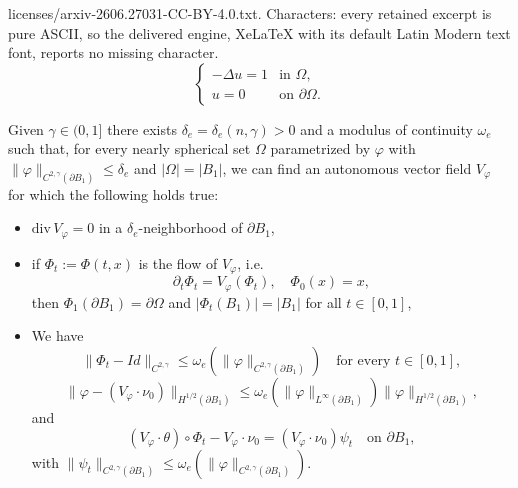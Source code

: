 \documentclass[10pt,a4paper]{amsart}
\newcommand{\abs}[1]{{\left|#1\right|}}
\begin{document}
licenses/arxiv-2606.27031-CC-BY-4.0.txt. Characters: every retained excerpt is pure ASCII, so the delivered engine, XeLaTeX with its default Latin Modern text font, reports no missing character.
\begin{equation}\label{Problema(u)}
    \begin{cases}
        -\Delta u=1 & \text{in } \Omega,\\
        u=0 & \text{on } \partial\Omega.
    \end{cases}
\end{equation}

\begin{lemma}\label{lemmaA.1}
    Given $\gamma\in(0,1]$ there exists $\delta_e=\delta_e(n,\gamma)>0$ and a modulus of continuity $\omega_e$ such that, for every nearly spherical set $\Omega$ parametrized by $\varphi$ with $\|\varphi\|_{C^{2,\gamma}(\partial B_1)}\leq\delta_e$ and $\abs{\Omega}=\abs{B_1}$, we can find an autonomous vector field $V_\varphi$ for which the following holds true:
    \begin{itemize}
        \item [(i)] $\mathrm{div}\,V_\varphi=0$ in a $\delta_e$-neighborhood of $\partial B_1$,
        \item [(ii)] if $\Phi_t:=\Phi(t,x)$ is the flow of $V_\varphi$, i.e.
        \begin{equation*}
            \partial_t \Phi_t=V_\varphi(\Phi_t),\quad \Phi_0(x)=x,
        \end{equation*}
        then $\Phi_1(\partial B_1)=\partial\Omega$ and $\abs{\Phi_t(B_1)}=\abs{B_1}$ for all $t\in[0,1]$,
        \item [(iii)] We have  
        \begin{equation*}
            \|\Phi_t-Id\|_{C^{2,\gamma}}\leq\omega_e(\|\varphi\|_{C^{2,\gamma}(\partial B_1)})\quad \text{for every }t\in[0,1],
        \end{equation*}
        \begin{equation*}
            \|\varphi-(V_\varphi\cdot\nu_0)\|_{H^{1/2}(\partial B_1)}\leq\omega_e(\|\varphi\|_{L^\infty(\partial B_1)})\|\varphi\|_{H^{1/2}(\partial B_1)},
        \end{equation*}
        and
        \begin{equation*}
            (V_\varphi\cdot\theta)\circ\Phi_t-V_\varphi\cdot\nu_0=(V_\varphi\cdot\nu_0)\psi_t \quad \text{on }\partial B_1,
        \end{equation*}
        with $\|\psi_t\|_{C^{2,\gamma}(\partial B_1)}\leq\omega_e(\|\varphi\|_{C^{2,\gamma}(\partial B_1)})$.
    \end{itemize}
\end{lemma}
\end{document}
